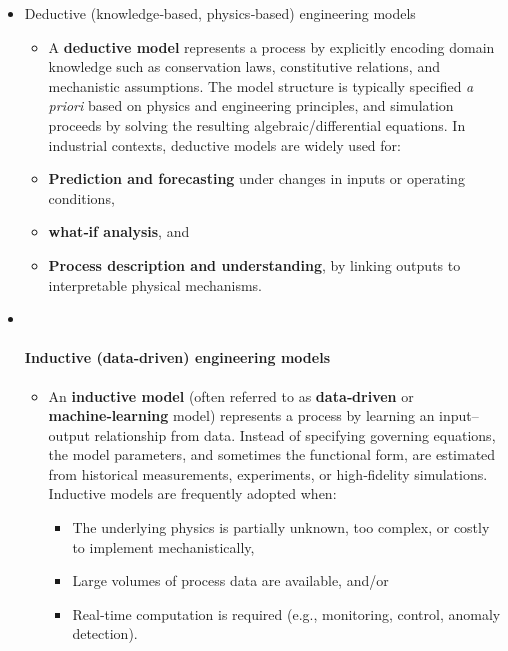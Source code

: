\documentclass[
]{article}
\providecommand{\tightlist}{%
  \setlength{\itemsep}{0pt}\setlength{\parskip}{0pt}}
\begin{document}
\begin{itemize}
\begin{itemize}
    \begin{itemize}
    \item
      Deductive (knowledge‑based, physics‑based) engineering models

      \begin{itemize}
      \tightlist
      \item
        A \textbf{deductive model} represents a process by explicitly
        encoding domain knowledge such as conservation laws,
        constitutive relations, and mechanistic assumptions. The model
        structure is typically specified \emph{a priori} based on
        physics and engineering principles, and simulation proceeds by
        solving the resulting algebraic/differential equations. In
        industrial contexts, deductive models are widely used for:
      \item
        \textbf{Prediction and forecasting} under changes in inputs or
        operating conditions,
      \item
        \textbf{what‑if analysis}, and
      \item
        \textbf{Process description and understanding}, by linking
        outputs to interpretable physical mechanisms.
      \end{itemize}
    \item ~
      \paragraph{Inductive (data‑driven) engineering
      models}\label{inductive-datadriven-engineering-models}

      \begin{itemize}
      \tightlist
      \item
        An \textbf{inductive model} (often referred to as
        \textbf{data‑driven} or \textbf{machine‑learning} model)
        represents a process by learning an input--output relationship
        from data. Instead of specifying governing equations, the model
        parameters, and sometimes the functional form, are estimated
        from historical measurements, experiments, or high‑fidelity
        simulations. Inductive models are frequently adopted when:

        \begin{itemize}
        \tightlist
        \item
          The underlying physics is partially unknown, too complex, or
          costly to implement mechanistically,
        \item
          Large volumes of process data are available, and/or
        \item
          Real‑time computation is required (e.g., monitoring, control,
          anomaly detection).
        \end{itemize}
      \end{itemize}


\end{itemize}
\end{itemize}
\end{itemize}
\end{document}

